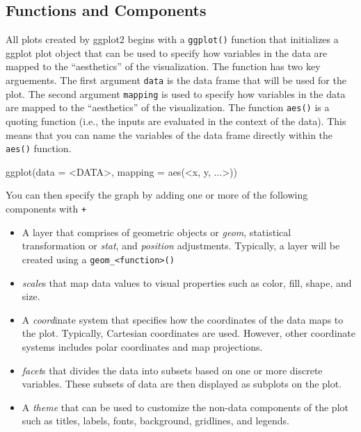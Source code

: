 \documentclass[
]{book}
\newenvironment{Shaded}{\begin{snugshade}}{\end{snugshade}}
\newcommand{\AttributeTok}[1]{\textcolor[rgb]{0.77,0.63,0.00}{#1}}
\newcommand{\FunctionTok}[1]{\textcolor[rgb]{0.00,0.00,0.00}{#1}}
\newcommand{\NormalTok}[1]{#1}
\newcommand{\SpecialCharTok}[1]{\textcolor[rgb]{0.00,0.00,0.00}{#1}}
\providecommand{\tightlist}{%
  \setlength{\itemsep}{0pt}\setlength{\parskip}{0pt}}
\begin{document}
\hypertarget{functions-and-components}{%
\subsection{Functions and Components}\label{functions-and-components}}

All plots created by ggplot2 begins with a \texttt{ggplot()} function that initializes a ggplot plot object that can be used to specify how variables in the data are mapped to the ``aesthetics'' of the visualization. The function has two key arguements. The first argument \texttt{data} is the data frame that will be used for the plot. The second argument \texttt{mapping} is used to specify how variables in the data are mapped to the ``aesthetics'' of the visualization. The function \texttt{aes()} is a quoting function (i.e., the inputs are evaluated in the context of the data). This means that you can name the variables of the data frame directly within the \texttt{aes()} function.

\begin{Shaded}
\begin{Highlighting}[]
\FunctionTok{ggplot}\NormalTok{(}\AttributeTok{data =} \SpecialCharTok{\textless{}}\NormalTok{DATA}\SpecialCharTok{\textgreater{}}\NormalTok{, }\AttributeTok{mapping =} \FunctionTok{aes}\NormalTok{(}\SpecialCharTok{\textless{}}\NormalTok{x, y, ...}\SpecialCharTok{\textgreater{}}\NormalTok{))}
\end{Highlighting}
\end{Shaded}

You can then specify the graph by adding one or more of the following components with \texttt{+}

\begin{itemize}
\tightlist
\item
  A layer that comprises of geometric objects or \emph{geom}, statistical transformation or \emph{stat}, and \emph{position} adjustments. Typically, a layer will be created using a \texttt{geom\_\textless{}function\textgreater{}()}
\item
  \emph{scale}s that map data values to visual properties such as color, fill, shape, and size.
\item
  A \emph{coord}inate system that specifies how the coordinates of the data maps to the plot. Typically, Cartesian coordinates are used. However, other coordinate systems includes polar coordinates and map projections.
\item
  \emph{facet}s that divides the data into subsets based on one or more discrete variables. These subsets of data are then displayed as subplots on the plot.
\item
  A \emph{theme} that can be used to customize the non-data components of the plot such as titles, labels, fonts, background, gridlines, and legends.
\end{itemize}
\end{document}
